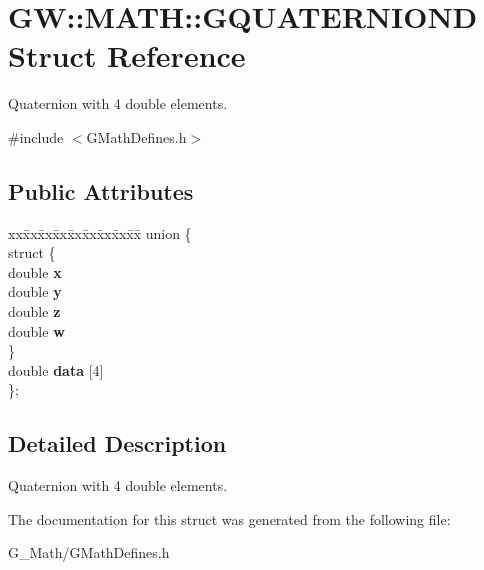 \hypertarget{struct_g_w_1_1_m_a_t_h_1_1_g_q_u_a_t_e_r_n_i_o_n_d}{}\section{GW\+:\+:M\+A\+TH\+:\+:G\+Q\+U\+A\+T\+E\+R\+N\+I\+O\+ND Struct Reference}
\label{struct_g_w_1_1_m_a_t_h_1_1_g_q_u_a_t_e_r_n_i_o_n_d}


Quaternion with 4 double elements.  




{\ttfamily \#include $<$G\+Math\+Defines.\+h$>$}

\subsection*{Public Attributes}
\begin{DoxyCompactItemize}
\item 
\mbox{\label{struct_g_w_1_1_m_a_t_h_1_1_g_q_u_a_t_e_r_n_i_o_n_d_ae549f754f2f182bce994f6e7f1daf553}} 
\begin{tabbing}
xx\=xx\=xx\=xx\=xx\=xx\=xx\=xx\=xx\=\kill
union \{\\
\mbox{\label{union_g_w_1_1_m_a_t_h_1_1_g_q_u_a_t_e_r_n_i_o_n_d_1_1_0D24_ae5bbc9fad6ef88c3f9c1a5171c52741d}} 
\>struct \{\\
\>\>double {\bfseries x}\\
\>\>double {\bfseries y}\\
\>\>double {\bfseries z}\\
\>\>double {\bfseries w}\\
\>\} \\
\>double {\bfseries data} \mbox{[}4\mbox{]}\\
\}; \\

\end{tabbing}\end{DoxyCompactItemize}


\subsection{Detailed Description}
Quaternion with 4 double elements. 

The documentation for this struct was generated from the following file\+:\begin{DoxyCompactItemize}
\item 
G\+\_\+\+Math/G\+Math\+Defines.\+h\end{DoxyCompactItemize}

